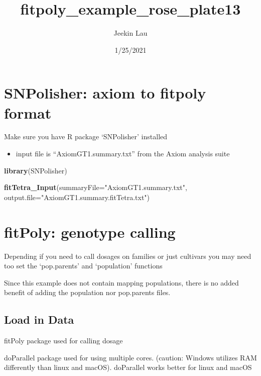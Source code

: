 \documentclass[
]{article}
\title{fitpoly\_example\_rose\_plate13}
\author{Jeekin Lau}
\date{1/25/2021}
\newenvironment{Shaded}{\begin{snugshade}}{\end{snugshade}}
\newcommand{\DataTypeTok}[1]{\textcolor[rgb]{0.13,0.29,0.53}{#1}}
\newcommand{\KeywordTok}[1]{\textcolor[rgb]{0.13,0.29,0.53}{\textbf{#1}}}
\newcommand{\NormalTok}[1]{#1}
\newcommand{\StringTok}[1]{\textcolor[rgb]{0.31,0.60,0.02}{#1}}
\providecommand{\tightlist}{%
  \setlength{\itemsep}{0pt}\setlength{\parskip}{0pt}}
\begin{document}
\maketitle

{
\setcounter{tocdepth}{2}
\tableofcontents
}
\hypertarget{snpolisher-axiom-to-fitpoly-format}{%
\section{SNPolisher: axiom to fitpoly
format}\label{snpolisher-axiom-to-fitpoly-format}}

Make sure you have R package `SNPolisher' installed

\begin{itemize}
\tightlist
\item
  input file is ``AxiomGT1.summary.txt'' from the Axiom analysis suite
\end{itemize}

\begin{Shaded}
\begin{Highlighting}[]
\KeywordTok{library}\NormalTok{(SNPolisher)}

\KeywordTok{fitTetra_Input}\NormalTok{(}\DataTypeTok{summaryFile=}\StringTok{"AxiomGT1.summary.txt"}\NormalTok{,}
               \DataTypeTok{output.file=}\StringTok{"AxiomGT1.summary.fitTetra.txt"}\NormalTok{)}
\end{Highlighting}
\end{Shaded}

\hypertarget{fitpoly-genotype-calling}{%
\section{fitPoly: genotype calling}\label{fitpoly-genotype-calling}}

Depending if you need to call dosages on families or just cultivars you
may need too set the `pop.parents' and `population' functions

Since this example does not contain mapping populations, there is no
added benefit of adding the population nor pop.parents files.

\hypertarget{load-in-data}{%
\subsection{Load in Data}\label{load-in-data}}

fitPoly package used for calling dosage

doParallel package used for using multiple cores. (caution: Windows
utilizes RAM differently than linux and macOS). doParallel works better
for linux and macOS
\end{document}
